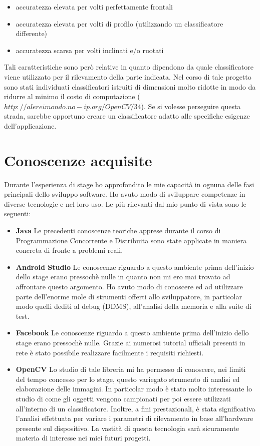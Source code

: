 \begin{itemize}
\item accuratezza elevata per volti perfettamente frontali
\item accuratezza elevata per volti di profilo (utilizzando un classificatore differente)
\item accuratezza scarsa per volti inclinati e/o ruotati
\end{itemize}

Tali caratteristiche sono però relative in quanto dipendono da quale classificatore viene utilizzato per il rilevamento della parte indicata. Nel corso di tale progetto sono stati individuati classificatori istruiti di dimensioni molto ridotte in modo da ridurre al minimo il costo di computazione (\textit{$http://alereimondo.no-ip.org/OpenCV/34$}). Se si volesse perseguire questa strada, sarebbe opportuno creare un classificatore adatto alle specifiche esigenze dell'applicazione.

\section{Conoscenze acquisite}

Durante l'esperienza di stage ho approfondito le mie capacità in ognuna delle fasi principali
dello sviluppo software. Ho avuto modo di sviluppare competenze in diverse tecnologie e nel loro uso. Le più rilevanti dal mio punto di vista sono le seguenti:

\begin{itemize}
\item \textbf{Java} Le precedenti conoscenze teoriche apprese durante il corso di Programmazione Concorrente e Distribuita sono state applicate in maniera concreta di fronte a problemi reali. 
\item \textbf{Android Studio} Le conoscenze riguardo a questo ambiente prima dell'inizio dello stage erano pressochè nulle in quanto non mi ero mai trovato ad affrontare
questo argomento. Ho avuto modo di conoscere ed ad utilizzare parte dell'enorme mole di strumenti offerti allo sviluppatore, in particolar modo quelli dediti al debug (DDMS), all'analisi della memoria e alla suite di test.
\item \textbf{Facebook} Le conoscenze riguardo a questo ambiente prima dell'inizio dello stage erano pressochè nulle. Grazie ai numerosi tutorial ufficiali presenti in rete è stato possibile realizzare facilmente i requisiti richiesti.
\item \textbf{OpenCV} Lo studio di tale libreria mi ha permesso di conoscere, nei limiti del tempo concesso per lo stage, questo variegato strumento di analisi ed elaborazione delle immagini. In particolar modo è stato molto interessante lo studio di come gli oggetti vengono campionati per poi essere utilizzati all'interno di un classificatore. Inoltre, a fini prestazionali, è stata significativa l'analisi effettuata per variare i parametri di rilevamento in base all'hardware presente sul dispositivo. La vastità di questa tecnologia sarà sicuramente materia di interesse nei miei futuri progetti. 
\end{itemize}

